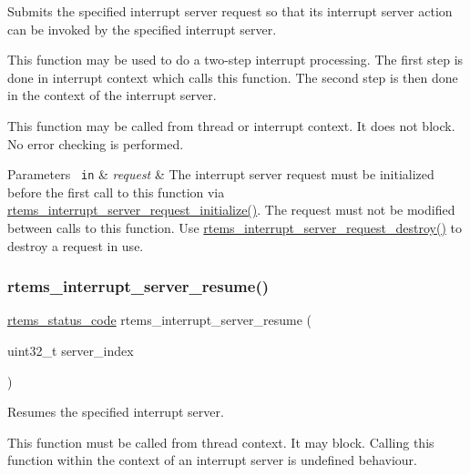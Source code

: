 Submits the specified interrupt server request so that its interrupt server action can be invoked by the specified interrupt server. 

This function may be used to do a two-\/step interrupt processing. The first step is done in interrupt context which calls this function. The second step is then done in the context of the interrupt server.

This function may be called from thread or interrupt context. It does not block. No error checking is performed.


\begin{DoxyParams}[1]{Parameters}
\mbox{\texttt{ in}}  & {\em request} & The interrupt server request must be initialized before the first call to this function via \mbox{\hyperlink{group__rtems__interrupt__extension_ga6cd3744454ee6cbaf6aa77ba3e6d956d}{rtems\+\_\+interrupt\+\_\+server\+\_\+request\+\_\+initialize()}}. The request must not be modified between calls to this function. Use \mbox{\hyperlink{group__rtems__interrupt__extension_ga214d16550a77f48cfb461afd9e7d2006}{rtems\+\_\+interrupt\+\_\+server\+\_\+request\+\_\+destroy()}} to destroy a request in use. \\
\hline
\end{DoxyParams}
\mbox{\label{group__rtems__interrupt__extension_ga69c0c38dd1999db80b4104a327caba46}} 
\subsubsection{\texorpdfstring{rtems\_interrupt\_server\_resume()}{rtems\_interrupt\_server\_resume()}}
{\footnotesize\ttfamily \mbox{\hyperlink{group__ClassicStatus_ga545d41846817eaba6143d52ee4d9e9fe}{rtems\+\_\+status\+\_\+code}} rtems\+\_\+interrupt\+\_\+server\+\_\+resume (\begin{DoxyParamCaption}\item[{uint32\+\_\+t}]{server\+\_\+index }\end{DoxyParamCaption})}



Resumes the specified interrupt server. 

This function must be called from thread context. It may block. Calling this function within the context of an interrupt server is undefined behaviour.


